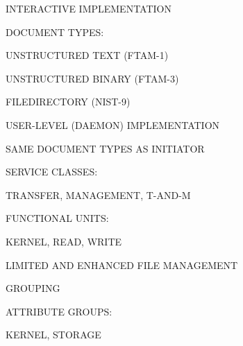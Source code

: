 \begin{bwslide}

\begin{nrtc}
\item	INTERACTIVE IMPLEMENTATION

\item	DOCUMENT TYPES:
    \begin{nrtc}
    \item	UNSTRUCTURED TEXT (FTAM-1)

    \item	UNSTRUCTURED BINARY (FTAM-3)

    \item	FILEDIRECTORY (NIST-9)
    \end{nrtc}
\end{nrtc}
\end{bwslide}


\begin{bwslide}

\begin{nrtc}
\item	USER-LEVEL (DAEMON) IMPLEMENTATION

\item	SAME DOCUMENT TYPES AS INITIATOR

\item	SERVICE CLASSES:
    \begin{nrtc}
    \item	TRANSFER, MANAGEMENT, T-AND-M
    \end{nrtc}

\item	FUNCTIONAL UNITS:
    \begin{nrtc}
    \item	KERNEL, READ, WRITE

    \item	LIMITED AND ENHANCED FILE MANAGEMENT

    \item	GROUPING
    \end{nrtc}

\item	ATTRIBUTE GROUPS:
    \begin{nrtc}
    \item	KERNEL, STORAGE
    \end{nrtc}
\end{nrtc}
\end{bwslide}


